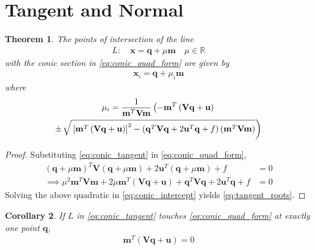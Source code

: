 \documentclass[]{interact}
\theoremstyle{plain}%
\newtheorem{theorem}{Theorem}[section]
\newtheorem{corollary}[theorem]{Corollary}
\theoremstyle{definition}
\theoremstyle{remark}
\providecommand{\sbrak}[1]{\ensuremath{{}\left[#1\right]}}
\providecommand{\brak}[1]{\ensuremath{\left(#1\right)}}
\providecommand{\lbrak}[1]{\ensuremath{\left(#1\right.}}
\providecommand{\rbrak}[1]{\ensuremath{\left.#1\right)}}
\let\vec\mathbf
\begin{document}
\section{ Tangent and Normal}
\begin{theorem}
  The points of intersection of the line 
\begin{align}
L: \quad \vec{x} = \vec{q} + \mu \vec{m} \quad \mu \in \mathbb{R}
\label{eq:conic_tangent}
\end{align}
with the conic section in \eqref{eq:conic_quad_form} are given by
\begin{align}
\vec{x}_i = \vec{q} + \mu_i \vec{m}
\end{align}
%
where
\begin{multline}
\mu_i = \frac{1}
{
\vec{m}^T\vec{V}\vec{m}
}
\lbrak{-\vec{m}^T\brak{\vec{V}\vec{q}+\vec{u}}}
\\
\pm
{\small
\rbrak{\sqrt{
\sbrak{
\vec{m}^T\brak{\vec{V}\vec{q}+\vec{u}}
}^2
-
\brak
{
\vec{q}^T\vec{V}\vec{q} + 2\vec{u}^T\vec{q} +f
}
\brak{\vec{m}^T\vec{V}\vec{m}}
}
}
}
\label{eq:tangent_roots}
\end{multline}


\end{theorem}
\begin{proof}
  Substituting \eqref{eq:conic_tangent}
in \eqref{eq:conic_quad_form}, 
\begin{align}
\brak{\vec{q} + \mu \vec{m}}^T\vec{V}\brak{\vec{q} + \mu \vec{m}}  + 2 \vec{u}^T\brak{\vec{q} + \mu \vec{m}}+f &= 0
\\
\implies \mu^2\vec{m}^T\vec{V}\vec{m} + 2 \mu\vec{m}^T\brak{\vec{V}\vec{q}+\vec{u}} 
+ \vec{q}^T\vec{V}\vec{q} + 2\vec{u}^T\vec{q} +f &= 0
\label{eq:conic_intercept}
\end{align}
Solving the above quadratic in \eqref{eq:conic_intercept}
yields \eqref{eq:tangent_roots}.
\end{proof}
\begin{corollary}
  If $L$ in \eqref{eq:conic_tangent} touches \eqref{eq:conic_quad_form} at exactly one point $\vec{q}$, 
  \begin{align}
  \vec{m}^T\brak{\vec{V}\vec{q}+\vec{u}} = 0
  \label{eq:conic_tangent_mq}
  \end{align}
\end{corollary}
\end{document}
